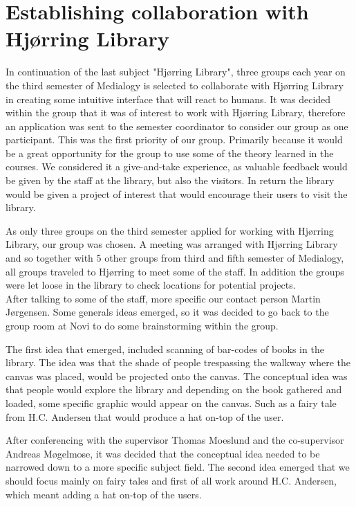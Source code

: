 \section{Establishing collaboration with Hjørring Library}
In continuation of the last subject "Hjørring Library", three groups each year on the third semester of Medialogy is selected to collaborate with Hjørring Library in creating some intuitive interface that will react to humans. It was decided within the group that it was of interest to work with Hjørring Library, therefore an application was sent to the semester coordinator to consider our group as one participant. This was the first priority of our group. Primarily because it would be a great opportunity for the group to use some of the theory learned in the courses. We considered it a give-and-take experience, as valuable feedback would be given by the staff at the library, but also the visitors. In return the library would be given a project of interest that would encourage their users to visit the library.

As only three groups on the third semester applied for working with Hjørring Library, our group was chosen. A meeting was arranged with Hjørring Library and so together with 5 other groups from third and fifth semester of Medialogy, all groups traveled to Hjørring to meet some of the staff. In addition the groups were let loose in the library to check locations for potential projects.\\
After talking to some of the staff, more specific our contact person Martin Jørgensen. Some generals ideas emerged, so it was decided to go back to the group room at Novi to do some brainstorming within the group.

The first idea that emerged, included scanning of bar-codes of books in the library. The idea was that the shade of people trespassing the walkway where the canvas was placed, would be projected onto the canvas. The conceptual idea was that people would explore the library and depending on the book gathered and loaded, some specific graphic would appear on the canvas. Such as a fairy tale from H.C. Andersen that would produce a hat on-top of the user.

After conferencing with the supervisor Thomas Moeslund and the co-supervisor Andreas Møgelmose, it was decided that the conceptual idea needed to be narrowed down to a more specific subject field. The second idea emerged that we should focus mainly on fairy tales and first of all work around H.C. Andersen, which meant adding a hat on-top of the users.

